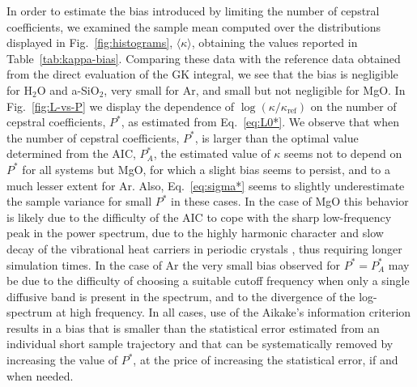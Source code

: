 In order to estimate the bias introduced by limiting the number of cepstral coefficients, we examined the sample mean computed over the distributions displayed in Fig.~\ref{fig:histograms}, $\langle\kappa\rangle$, obtaining the values reported in Table~\ref{tab:kappa-bias}. Comparing these data with the reference data obtained from  the direct evaluation of the GK integral, we see that the bias is negligible for H$_2$O and a-SiO$_2$, very small for Ar, and small but not negligible for MgO. In Fig.~\ref{fig:L-vs-P} we display the dependence of $\log(\kappa/\kappa_{\mathrm{ref}})$ on the number of cepstral coefficients, $P^*$, as estimated from Eq.~\eqref{eq:L0*}. We observe that when the number of cepstral coefficients, $P^*$, is larger than the optimal value determined from the AIC, $P_A^*$, the estimated value of $\kappa$ seems not to depend on $P^*$ for all systems but MgO, for which a slight bias seems to persist, and to a much lesser extent for Ar. Also, Eq.~\eqref{eq:sigma*} seems to slightly underestimate the sample variance for small $P^*$ in these cases. In the case of MgO this behavior is likely due to the difficulty of the AIC to cope with the sharp low-frequency peak in the power spectrum, due to the highly harmonic character and slow decay of the vibrational heat carriers in periodic crystals \cite{Carbogno:2017gc}, thus requiring longer simulation times. In the case of Ar the very small bias observed for $P^* =P^*_A$ may be due to the difficulty of choosing a suitable cutoff frequency when only a single diffusive band is present in the spectrum, and to the divergence of the log-spectrum at high frequency. In all cases, use of the Aikake's information criterion results in a bias that is smaller than the statistical error estimated from an individual short sample trajectory and that can be systematically removed by increasing the value of $P^*$, at the price of increasing the statistical error, if and when needed.



